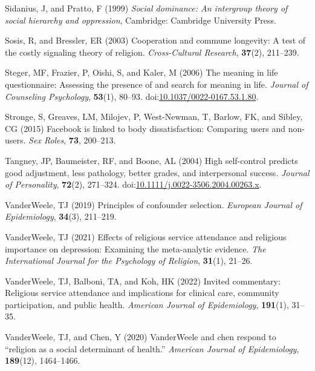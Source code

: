 \documentclass[
  single column]{article}
\newlength{\cslhangindent}
\newenvironment{CSLReferences}[2] %
 {\begin{list}{}{%
  \setlength{\itemindent}{0pt}
  \setlength{\leftmargin}{0pt}
  \setlength{\parsep}{0pt}
  \ifodd #1
   \setlength{\leftmargin}{\cslhangindent}
   \setlength{\itemindent}{-1\cslhangindent}
  \fi
  \setlength{\itemsep}{#2\baselineskip}}}
 {\end{list}}
\begin{document}
\begin{CSLReferences}{1}{0}
Sidanius, J, and Pratto, F (1999) \emph{Social dominance: An intergroup
theory of social hierarchy and oppression}, Cambridge: Cambridge
University Press.

Sosis, R, and Bressler, ER (2003) Cooperation and commune longevity: A
test of the costly signaling theory of religion. \emph{Cross-Cultural
Research}, \textbf{37}(2), 211--239.

Steger, MF, Frazier, P, Oishi, S, and Kaler, M (2006) The meaning in
life questionnaire: Assessing the presence of and search for meaning in
life. \emph{Journal of Counseling Psychology}, \textbf{53}(1), 80--93.
doi:\href{https://doi.org/10.1037/0022-0167.53.1.80}{10.1037/0022-0167.53.1.80}.

Stronge, S, Greaves, LM, Milojev, P, West-Newman, T, Barlow, FK, and
Sibley, CG (2015) Facebook is linked to body dissatisfaction: Comparing
users and non-users. \emph{Sex Roles}, \textbf{73}, 200--213.

Tangney, JP, Baumeister, RF, and Boone, AL (2004) High self-control
predicts good adjustment, less pathology, better grades, and
interpersonal success. \emph{Journal of Personality}, \textbf{72}(2),
271--324.
doi:\href{https://doi.org/10.1111/j.0022-3506.2004.00263.x}{10.1111/j.0022-3506.2004.00263.x}.

VanderWeele, TJ (2019) Principles of confounder selection.
\emph{European Journal of Epidemiology}, \textbf{34}(3), 211--219.

VanderWeele, TJ (2021) Effects of religious service attendance and
religious importance on depression: Examining the meta-analytic
evidence. \emph{The International Journal for the Psychology of
Religion}, \textbf{31}(1), 21--26.

VanderWeele, TJ, Balboni, TA, and Koh, HK (2022) Invited commentary:
Religious service attendance and implications for clinical care,
community participation, and public health. \emph{American Journal of
Epidemiology}, \textbf{191}(1), 31--35.

VanderWeele, TJ, and Chen, Y (2020) VanderWeele and chen respond to
{``religion as a social determinant of health.''} \emph{American Journal
of Epidemiology}, \textbf{189}(12), 1464--1466.


\end{CSLReferences}
\end{document}
